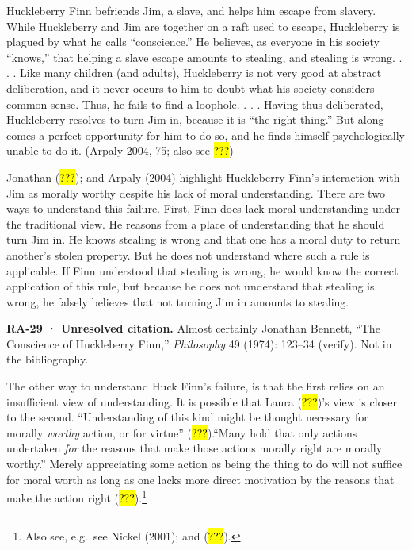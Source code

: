 \documentclass[
  letterpaper,
  DIV=11,
  numbers=noendperiod]{scrartcl}
\theoremstyle{remark}
\begin{document}
Huckleberry Finn befriends Jim, a slave, and helps him escape from
slavery. While Huckleberry and Jim are together on a raft used to
escape, Huckleberry is plagued by what he calls ``conscience.'' He
believes, as everyone in his society ``knows,'' that helping a slave
escape amounts to stealing, and stealing is wrong. . . . Like many
children (and adults), Huckleberry is not very good at abstract
deliberation, and it never occurs to him to doubt what his society
considers common sense. Thus, he fails to find a loophole. . . . Having
thus deliberated, Huckleberry resolves to turn Jim in, because it is
``the right thing.'' But along comes a perfect opportunity for him to do
so, and he finds himself psychologically unable to do it. (Arpaly 2004,
75; also see \hl{???})

Jonathan (\hl{???}); and Arpaly (2004) highlight Huckleberry Finn's
interaction with Jim as morally worthy despite his lack of moral
understanding. There are two ways to understand this failure. First,
Finn does lack moral understanding under the traditional view. He
reasons from a place of understanding that he should turn Jim in. He
knows stealing is wrong and that one has a moral duty to return
another's stolen property. But he does not understand where such a rule
is applicable. If Finn understood that stealing is wrong, he would know
the correct application of this rule, but because he does not understand
that stealing is wrong, he falsely believes that not turning Jim in
amounts to stealing.

\begin{tcolorbox}[enhanced jigsaw, arc=.35mm, bottomrule=.15mm, bottomtitle=1mm, breakable, colback=white, colbacktitle=quarto-callout-warning-color!10!white, colframe=quarto-callout-warning-color-frame, coltitle=black, left=2mm, leftrule=.75mm, opacityback=0, opacitybacktitle=0.6, rightrule=.15mm, title=\textcolor{quarto-callout-warning-color}{\faExclamationTriangle}\hspace{0.5em}{Warning}, titlerule=0mm, toprule=.15mm, toptitle=1mm]

\textbf{RA-29 · Unresolved citation.} Almost certainly Jonathan Bennett,
``The Conscience of Huckleberry Finn,'' \emph{Philosophy} 49 (1974):
123--34 (verify). Not in the bibliography.

\end{tcolorbox}

The other way to understand Huck Finn's failure, is that the first
relies on an insufficient view of understanding. It is possible that
Laura (\hl{???})'s view is closer to the second. ``Understanding of this
kind might be thought necessary for morally \emph{worthy} action, or for
virtue'' (\hl{???}).``Many hold that only actions undertaken \emph{for}
the reasons that make those actions morally right are morally worthy.''
Merely appreciating some action as being the thing to do will not
suffice for moral worth as long as one lacks more direct motivation by
the reasons that make the action right (\hl{???}).\footnote{Also see,
  e.g.~see Nickel (2001); and (\hl{???}).}
\end{document}
